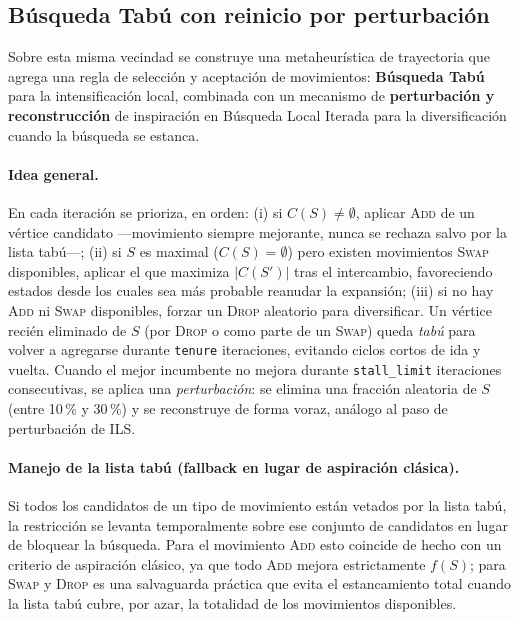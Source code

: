 \subsection{Búsqueda Tabú con reinicio por perturbación}\label{subsec:tabu_ils}

Sobre esta misma vecindad se construye una metaheurística de trayectoria que agrega una regla de selección y aceptación de movimientos: \textbf{Búsqueda Tabú} \parencite{glover1989tabu1, glover1990tabu2} para la intensificación local, combinada con un mecanismo de \textbf{perturbación y reconstrucción} de inspiración en Búsqueda Local Iterada \parencite{lourenco2003ils} para la diversificación cuando la búsqueda se estanca.

\paragraph{Idea general.} En cada iteración se prioriza, en orden: (i) si $C(S)\neq\emptyset$, aplicar \textsc{Add} de un vértice candidato —movimiento siempre mejorante, nunca se rechaza salvo por la lista tabú—; (ii) si $S$ es maximal ($C(S)=\emptyset$) pero existen movimientos \textsc{Swap} disponibles, aplicar el que maximiza $|C(S')|$ tras el intercambio, favoreciendo estados desde los cuales sea más probable reanudar la expansión; (iii) si no hay \textsc{Add} ni \textsc{Swap} disponibles, forzar un \textsc{Drop} aleatorio para diversificar. Un vértice recién eliminado de $S$ (por \textsc{Drop} o como parte de un \textsc{Swap}) queda \emph{tabú} para volver a agregarse durante \texttt{tenure} iteraciones, evitando ciclos cortos de ida y vuelta. Cuando el mejor incumbente no mejora durante \texttt{stall\_limit} iteraciones consecutivas, se aplica una \emph{perturbación}: se elimina una fracción aleatoria de $S$ (entre 10\,\% y 30\,\%) y se reconstruye de forma voraz, análogo al paso de perturbación de ILS.

\paragraph{Manejo de la lista tabú (fallback en lugar de aspiración clásica).} Si todos los candidatos de un tipo de movimiento están vetados por la lista tabú, la restricción se levanta temporalmente sobre ese conjunto de candidatos en lugar de bloquear la búsqueda. Para el movimiento \textsc{Add} esto coincide de hecho con un criterio de aspiración clásico, ya que todo \textsc{Add} mejora estrictamente $f(S)$; para \textsc{Swap} y \textsc{Drop} es una salvaguarda práctica que evita el estancamiento total cuando la lista tabú cubre, por azar, la totalidad de los movimientos disponibles.

